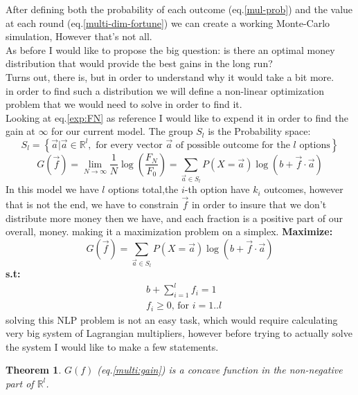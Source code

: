 \documentclass{article}
\newtheorem{thm}{Theorem}[section]
\begin{document}
	After defining both the probability of each outcome (eq.\ref{mul-prob}) and the value at each round (eq.\ref{multi-dim-fortune}) we can create a working Monte-Carlo simulation, However that's not all.\\
	As before I would like to propose the big question: is there an optimal money distribution that would provide the best gains in the long run?\\
	Turns out, there is, but in order to understand why it would take a bit more.\\
	in order to find such a distribution we will define a non-linear optimization problem that we would need to solve in order to find it.\\
	Looking at eq.\ref{exp:FN} as reference I would like to expend it in order to find the gain at $\infty$ for our current model.
	\newpage
	The group $S_l$ is the Probability space:
	\[S_l = \left\{\overrightarrow{a}|\overrightarrow{a} \in \mathbb{R}^l, \text{ for every vector } \overrightarrow{a} \text{ of possible outcome for the } l \text{ options} \right\}\]
	\begin{equation}
		\label{multi:gain}
		G(\overrightarrow{f}) = \lim_{N \to \infty} \frac{1}{N}\log(\frac{F_N}{F_0}) = \sum_{\overrightarrow{a} \in S_l} P(X=\overrightarrow{a})\log(b + \overrightarrow{f} \cdot \overrightarrow{a} )
	\end{equation}
	In this model we have $l$ options total,the $i$-th option have $k_i$ outcomes, however that is not the end, we have to constrain $\overrightarrow{f}$ in order to insure that we don't distribute more money then we have, and each fraction is a positive part of our overall, money.
	making it a maximization problem on a simplex.
	\newline \newline
	\textbf{Maximize:} \[
		G(\overrightarrow{f}) = \sum_{\overrightarrow{a} \in S_l} P(X=\overrightarrow{a})\log(b + \overrightarrow{f} \cdot \overrightarrow{a} )
		\]
	\textbf{s.t:}
	\[
	\begin{aligned}
		&b + \sum_{i=1}^{l} f_i = 1\\
		&f_i \ge 0 \text{, for } i=1..l
	\end{aligned}
	\]
	solving this NLP problem is not an easy task, which would require calculating very big system of Lagrangian multipliers, however before trying to actually solve the system I would like to make a few statements.
	\begin{thm}
		$G(f)$ (eq.\ref{multi:gain}) is a concave function in the non-negative part of $\mathbb{R}^l$.
	\end{thm}
\end{document}
